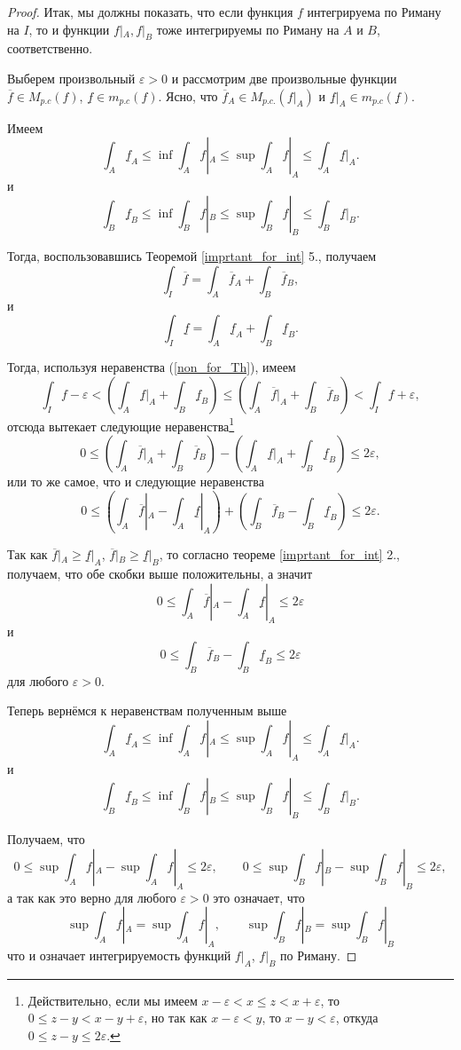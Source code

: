 \begin{proof}
Итак, мы должны показать, что если функция $f$ интегрируема по Риману на $I$, то и функции $f|_A, f|_B$ тоже интегрируемы по Риману на $A$ и $B$, соответственно.

Выберем произвольный $\varepsilon>0$ и рассмотрим две произвольные функции $\overline{f} \in M_{p.c}(f)$, $\underline{f} \in m_{p.c}(f)$. Ясно, что $\overline{f}_A \in M_{p.c.}(f|_A)$ и $\underline{f}|_A \in m_{p.c}(\underline{f}).$ 

Имеем
\[
\int_A \underline{f}_A \le \inf \int_A f|_A \le \sup \int_A f|_A \le \int_A \underline{f}|_A.
\]
и
\[
\int_B \underline{f}_B \le \inf \int_B f|_B \le \sup \int_B f|_B \le \int_B \underline{f}|_B.
\]

Тогда, воспользовавшись Теоремой \ref{imprtant_for_int} 5., получаем
\[
 \int_I \overline{f} = \int_A \overline{f}_A + \int_B \overline{f}_B,
\]
и
\[
 \int_I \underline{f} = \int_A \underline{f}_A + \int_B \underline{f}_B.
\]

Тогда, используя неравенства (\ref{non_for_Th}), имеем
\[
 \int_I f - \varepsilon < \left( \int_A \underline{f}|_A + \int_B \underline{f}_B \right) \le \left( \int_A \overline{f}|_A + \int_B \overline{f}_B \right) < \int_I f + \varepsilon,
\]
отсюда вытекает следующие неравенства\footnote{Действительно, если мы имеем $x-\varepsilon < x \le z < x+\varepsilon$, то $0 \le z-y < x-y+\varepsilon$, но так как $x-\varepsilon <y$, то $x-y<\varepsilon$, откуда $0 \le z - y \le 2 \varepsilon.$}
\[
 0 \le \left( \int_A \overline{f}|_A + \int_B \overline{f}_B \right) -  \left( \int_A \underline{f}|_A + \int_B \underline{f}_B \right) \le 2 \varepsilon,
\]
или то же самое, что и следующие неравенства
\[
 0 \le \left( \int_A \overline{f}|_A - \int_A \underline{f}|_A  \right) + \left( \int_B \overline{f}_B  -\int_B \underline{f}_B \right) \le 2 \varepsilon.
\]

Так как $\overline{f}|_A \ge \underline{f}|_A$, $\overline{f}|_B \ge \underline{f}|_B$, то согласно теореме \ref{imprtant_for_int} 2., получаем, что обе скобки выше положительны, а значит 
\[
 0 \le \int_A \overline{f}|_A - \int_A \underline{f}|_A  \le 2 \varepsilon
\]
и
\[
 0 \le \int_B \overline{f}_B  - \int_B \underline{f}_B \le 2 \varepsilon
\]
для любого $\varepsilon>0.$

Теперь вернёмся к неравенствам полученным выше
\[
\int_A \underline{f}_A \le \inf \int_A f|_A \le \sup \int_A f|_A \le \int_A \underline{f}|_A.
\]
и
\[
\int_B \underline{f}_B \le \inf \int_B f|_B \le \sup \int_B f|_B \le \int_B \underline{f}|_B.
\]

Получаем, что
\[
0 \le \sup \int_A f|_A - \sup \int_A f|_A \le 2\varepsilon, \qquad 0 \le \sup \int_B f|_B - \sup \int_B f|_B \le 2\varepsilon,
\]
а так как это верно для любого $\varepsilon>0$ это означает, что 
\[
 \sup \int_A f|_A = \sup \int_A f|_A, \qquad \sup \int_B f|_B = \sup \int_B f|_B
\]
что и означает интегрируемость функций $f|_A$, $f|_B$ по Риману.
\end{proof}



